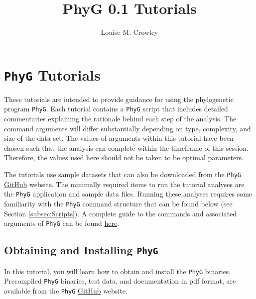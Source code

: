 \documentclass[11pt]{article}
\title{PhyG 0.1 Tutorials}
\author{Louise M. Crowley}
\newcommand{\phyg}{\texttt{PhyG} }
\begin{document}
\maketitle



\section{\phyg Tutorials}

These tutorials are intended to provide guidance for using the phylogenetic 
program \texttt{PhyG}. Each tutorial contains a \phyg script that includes 
detailed commentaries explaining the rationale behind each step of the analysis. 
The command arguments will differ substantially depending on type, complexity, 
and size of the data set. The values of arguments within this tutorial have been 
chosen such that the analysis can complete within the timeframe of this session.
Therefore, the values used here should not be taken to be optimal parameters. 

The tutorials use sample datasets that can also be downloaded from the \texttt{PhyG} 
\href{https://github.com/amnh/PhyGraph}{GitHub} website. The minimally required 
items to run the tutorial analyses are the \phyg application and sample data files. 
Running these analyses requires some familiarity with the \phyg command structure 
that can be found below (see Section \ref{subsec:Scripts}). A complete guide to the
commands and associated arguments of \phyg can be found 
\href{https://github.com/amnh/PhyGraph}{here}.

\subsection{Obtaining and Installing \phyg}
\label{subsec:Installation}

In this tutorial, you will learn how to obtain and install the \phyg binaries.  
Precompiled \phyg binaries, test data, and documentation in pdf format, are available 
from the \phyg \href{https://github.com/amnh/PhyGraph}{GitHub} website. 
\end{document}
